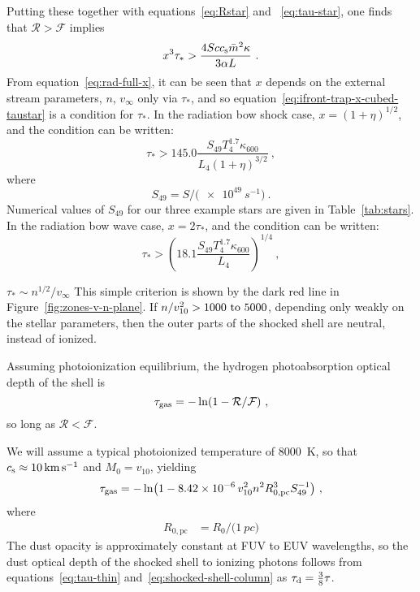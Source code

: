 Putting these together with equations~\eqref{eq:Rstar} and
~\eqref{eq:tau-star}, one finds that \(\mathcal{R} > \mathcal{F}\)
implies
\begin{equation}
  \label{eq:ifront-trap-x-cubed-taustar-app}
  x^3 \tau_* > \frac{4 S c \sound \bar{m}^2 \kappa}{3 \alpha L} \ .
\end{equation}
From equation~\eqref{eq:rad-full-x}, it can be seen that \(x\) depends
on the external stream parameters, \(n\), \(v_\infty\) only via
\(\tau_*\), and so equation~\eqref{eq:ifront-trap-x-cubed-taustar} is a
condition for \(\tau_*\).  In the radiation bow shock case,
\(x = (1 + \eta)^{1/2}\), and the condition can be written:
\begin{equation}
  \label{eq:ifront-trap-taustar-bow-shock}
  \tau_* > 145.0 \frac{S_{49} T_4^{1.7} \kappa_{600}}{L_4 (1 + \eta)^{3/2}} \ , 
\end{equation}
where
\begin{equation*}
  S_{49} = S / \bigl( \SI{e49}{s^{-1}} \bigr) \ .
\end{equation*}
Numerical values of \(S_{49}\) for our three example stars are given
in Table~\ref{tab:stars}.  In the radiation bow wave case,
\(x = 2\tau_*\), and the condition can be written:
\begin{equation}
  \label{eq:ifront-trap-taustar-bow-wave}
  \tau_* > \left(  18.1 \frac{S_{49} T_4^{1.7} \kappa_{600}}{L_4}\right)^{1/4} \ , 
\end{equation}



\(\tau_* \sim n^{1/2} / v_\infty\) 
This simple
criterion is shown by the dark red line in
Figure~\ref{fig:zones-v-n-plane}.  If 
\(n / v_{10}^2 > \text{\numrange{1000}{5000}}\), depending
only weakly on the stellar parameters, then the outer parts of the
shocked shell are neutral, instead of ionized. 


Assuming photoionization equilibrium, the
hydrogen photoabsorption optical depth of the shell is
\begin{equation}
  \label{eq:ion-tau-gas}
  \tau_{\text{gas}} = - \ln(1 - \mathcal{R} / \mathcal{F}) \ ,
\end{equation}
so long as \(\mathcal{R} < \mathcal{F}\).

We will assume
a typical photoionized temperature of \SI{8000}{K}, so that
\(c_{\text{s}} \approx \SI{10}{km.s^{-1}}\) and \(M_0 = v_{10}\), yielding
\begin{equation}
  \label{eq:ion-tau-gas-expanded}
  \tau\gas = -\ln\bigl(1 -
  \num{8.42e-6}\, v_{10}^2 n^2 R_{0,\text{pc}}^3 S_{49}^{-1}\bigr) \ , 
\end{equation}
where 
\begin{align*}
  R_{0,\text{pc}} &= R_0 / \bigl( \SI{1}{pc} \bigr)
\end{align*}
The dust opacity is approximately constant
at FUV to EUV wavelengths, so the dust optical depth of the shocked
shell to ionizing photons follows from equations~\eqref{eq:tau-thin}
and~\eqref{eq:shocked-shell-column} as \(\tau_{\text{d}} = \tfrac38 \tau\).

